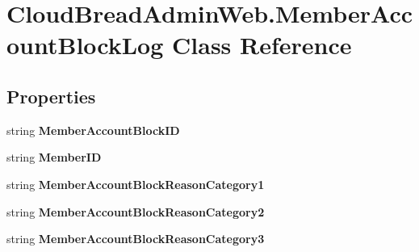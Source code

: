 \hypertarget{class_cloud_bread_admin_web_1_1_member_account_block_log}{}\section{Cloud\+Bread\+Admin\+Web.\+Member\+Account\+Block\+Log Class Reference}
\label{class_cloud_bread_admin_web_1_1_member_account_block_log}
\subsection*{Properties}
\begin{DoxyCompactItemize}
\item 
string {\bfseries Member\+Account\+Block\+ID}\hypertarget{class_cloud_bread_admin_web_1_1_member_account_block_log_a6a6192582fcf51cd441d528a85a34270}{}\label{class_cloud_bread_admin_web_1_1_member_account_block_log_a6a6192582fcf51cd441d528a85a34270}

\item 
string {\bfseries Member\+ID}\hypertarget{class_cloud_bread_admin_web_1_1_member_account_block_log_a6d0d97c60b43a51c9544972ba121dd6f}{}\label{class_cloud_bread_admin_web_1_1_member_account_block_log_a6d0d97c60b43a51c9544972ba121dd6f}

\item 
string {\bfseries Member\+Account\+Block\+Reason\+Category1}\hypertarget{class_cloud_bread_admin_web_1_1_member_account_block_log_ab8f3148b73762d3d6ab4c453221b999d}{}\label{class_cloud_bread_admin_web_1_1_member_account_block_log_ab8f3148b73762d3d6ab4c453221b999d}

\item 
string {\bfseries Member\+Account\+Block\+Reason\+Category2}\hypertarget{class_cloud_bread_admin_web_1_1_member_account_block_log_a640f57686213a599914dd82870b80973}{}\label{class_cloud_bread_admin_web_1_1_member_account_block_log_a640f57686213a599914dd82870b80973}

\item 
string {\bfseries Member\+Account\+Block\+Reason\+Category3}\hypertarget{class_cloud_bread_admin_web_1_1_member_account_block_log_a54838f5c1dbeda4dfe5d111cefe7f5eb}{}\label{class_cloud_bread_admin_web_1_1_member_account_block_log_a54838f5c1dbeda4dfe5d111cefe7f5eb}


\end{DoxyCompactItemize}
